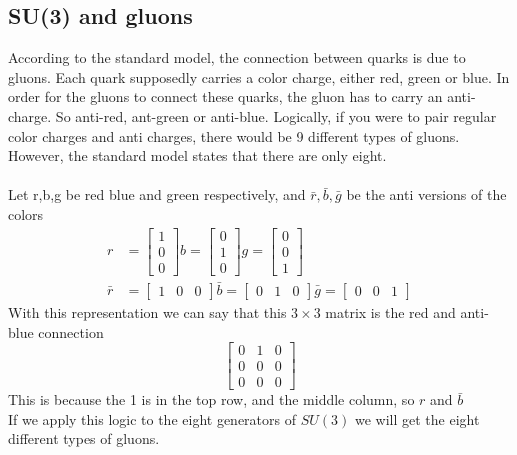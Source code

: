 \documentclass[12pt,journal,compsoc]{IEEEtran}
\begin{document}
\subsection{SU(3) and gluons}
According to the standard model, the connection between quarks is due to gluons. Each quark supposedly carries a color charge, either red, green or blue. In order for the gluons to connect these quarks, the gluon has to carry an anti-charge. So anti-red, ant-green or anti-blue. Logically, if you were to pair regular color charges and anti charges, there would be 9 different types of gluons. However, the standard model states that there are only eight.\\\\
Let r,b,g be red blue and green respectively, and $\bar{r}, \bar{b}, \bar{g}$ be the anti versions of the colors
\begin{align*}
	r &= \left[ \begin{matrix}
	1\\ 0\\ 0
	\end{matrix} \right]
	b = \left[ \begin{matrix}
	0\\ 1\\ 0
	\end{matrix} \right]
	g = \left[ \begin{matrix}
	0\\ 0\\ 1
	\end{matrix} \right] \\
	\bar{r} &= \left[ \begin{matrix}
	1 & 0 & 0
	\end{matrix} \right]
	\bar{b} = \left[ \begin{matrix}
	0 & 1 & 0
	\end{matrix} \right]
	\bar{g} = \left[ \begin{matrix}
	0 & 0 & 1
	\end{matrix} \right]
\end{align*}
With this representation we can say that this $3 \times 3$ matrix is the red and anti-blue connection
\[
	\left[ \begin{matrix}
	0 & 1 & 0\\
	0 & 0 & 0\\
	0 & 0 & 0
	\end{matrix} \right]
\]
This is because the 1 is in the top row, and the middle column, so $r$ and $\bar{b}$\\
If we apply this logic to the eight generators of $SU(3)$ we will get the eight different types of gluons.
\end{document}
